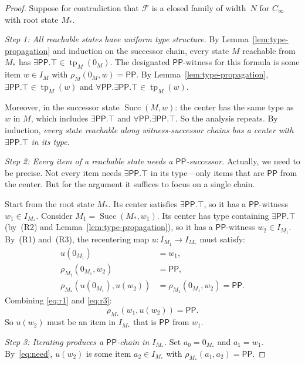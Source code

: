 \documentclass[11pt]{article}
\theoremstyle{definition}
\newcommand{\tp}{\operatorname{tp}}
\newcommand{\Pp}{\mathsf{PP}}
\newcommand{\Succ}{\operatorname{Succ}}
\begin{document}
\begin{proof}
Suppose for contradiction that $\mathcal{F}$ is a closed family of
width~$N$ for $C_\infty$ with root state $M_\ast$.

\medskip\noindent\textit{Step 1: All reachable states have uniform type
structure.}\;
By Lemma~\ref{lem:type-propagation} and induction on the successor
chain, every state $M$ reachable from $M_\ast$ has
$\exists\Pp.\top\in\tp_M(0_M)$.  The designated $\Pp$-witness for
this formula is some item $w\in I_M$ with $\rho_M(0_M,w)=\Pp$.  By
Lemma~\ref{lem:type-propagation}, $\exists\Pp.\top\in\tp_M(w)$ and
$\forall\Pp.\exists\Pp.\top\in\tp_M(w)$.

Moreover, in the successor state $\Succ(M,w)$: the center has the
same type as $w$ in $M$, which includes $\exists\Pp.\top$ and
$\forall\Pp.\exists\Pp.\top$.  So the analysis repeats.  By
induction, \emph{every state reachable along witness-successor chains
has a center with $\exists\Pp.\top$ in its type}.

\medskip\noindent\textit{Step 2: Every item of a reachable state needs
a $\Pp$-successor.}\;
Actually, we need to be precise.  Not every item needs
$\exists\Pp.\top$ in its type---only items that are $\Pp$ from the
center.  But for the argument it suffices to focus on a single chain.

Start from the root state $M_\ast$.  Its center satisfies
$\exists\Pp.\top$, so it has a $\Pp$-witness $w_1\in I_{M_\ast}$.
Consider $M_1=\Succ(M_\ast,w_1)$.  Its center has type containing
$\exists\Pp.\top$ (by~(R2) and Lemma~\ref{lem:type-propagation}), so
it has a $\Pp$-witness $w_2\in I_{M_1}$.  By~(R1) and~(R3), the
recentering map $u:I_{M_1}\to I_{M_\ast}$ must satisfy:
\begin{align}
u(0_{M_1}) &= w_1, \label{eq:r1}\\
\rho_{M_1}(0_{M_1},w_2) &= \Pp, \label{eq:witness}\\
\rho_{M_\ast}(u(0_{M_1}),u(w_2)) &= \rho_{M_1}(0_{M_1},w_2) = \Pp.
  \label{eq:r3}
\end{align}
Combining \eqref{eq:r1} and \eqref{eq:r3}:
\begin{equation}\label{eq:need}
\rho_{M_\ast}(w_1,u(w_2)) = \Pp.
\end{equation}
So $u(w_2)$ must be an item in $I_{M_\ast}$ that is $\Pp$ from $w_1$.

\medskip\noindent\textit{Step 3: Iterating produces a $\Pp$-chain in
$I_{M_\ast}$.}\;
Set $a_0 = 0_{M_\ast}$ and $a_1 = w_1$.  By~\eqref{eq:need}, $u(w_2)$
is some item $a_2\in I_{M_\ast}$ with $\rho_{M_\ast}(a_1,a_2)=\Pp$.


\end{proof}
\end{document}
